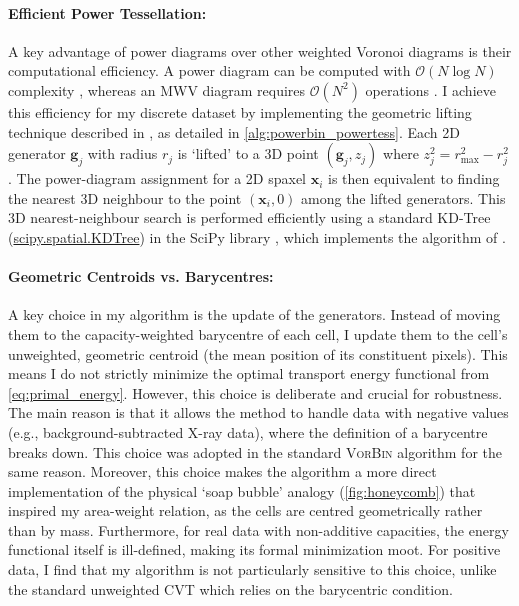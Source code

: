\documentclass[fleqn,usenatbib]{mnras}
\begin{document}
\paragraph*{Efficient Power Tessellation:}
A key advantage of power diagrams over other weighted Voronoi diagrams is their computational efficiency. A power diagram can be computed with $\mathcal{O}(N\log N)$ complexity \citep{Aurenhammer1987}, whereas an MWV diagram requires $\mathcal{O}(N^2)$ operations \citep{Aurenhammer1984}. I achieve this efficiency for my discrete dataset by implementing the geometric lifting technique described in \citet[Sec.~5]{Imai1985}, as detailed in \autoref{alg:powerbin_powertess}. Each 2D generator $\mathbf{g}_j$ with radius $r_j$ is `lifted' to a 3D point $(\mathbf{g}_j, z_j)$ where $z_j^2 = r_{\max}^2 - r_j^2$. The power-diagram assignment for a 2D spaxel $\mathbf{x}_i$ is then equivalent to finding the nearest 3D neighbour to the point $(\mathbf{x}_i, 0)$ among the lifted generators. This 3D nearest-neighbour search is performed efficiently using a standard KD-Tree (\href{https://docs.scipy.org/doc/scipy/reference/generated/scipy.spatial.KDTree.html}{scipy.spatial.KDTree}) in the SciPy library \citep{Scipy2020}, which implements the algorithm of \citet{Maneewongvatana1999}.

\paragraph*{Geometric Centroids vs. Barycentres:}
A key choice in my algorithm is the update of the generators. Instead of moving them to the capacity-weighted barycentre of each cell, I update them to the cell's unweighted, geometric centroid (the mean position of its constituent pixels). This means I do not strictly minimize the optimal transport energy functional from \autoref{eq:primal_energy}. However, this choice is deliberate and crucial for robustness. The main reason is that it allows the method to handle data with negative values (e.g., background-subtracted X-ray data), where the definition of a barycentre breaks down. This choice was adopted in the standard \textsc{VorBin} algorithm for the same reason. Moreover, this choice makes the algorithm a more direct implementation of the physical `soap bubble' analogy (\autoref{fig:honeycomb}) that inspired my area-weight relation, as the cells are centred geometrically rather than by mass. Furthermore, for real data with non-additive capacities, the energy functional itself is ill-defined, making its formal minimization moot. For positive data, I find that my algorithm is not particularly sensitive to this choice, unlike the standard unweighted CVT which relies on the barycentric condition.
\end{document}
